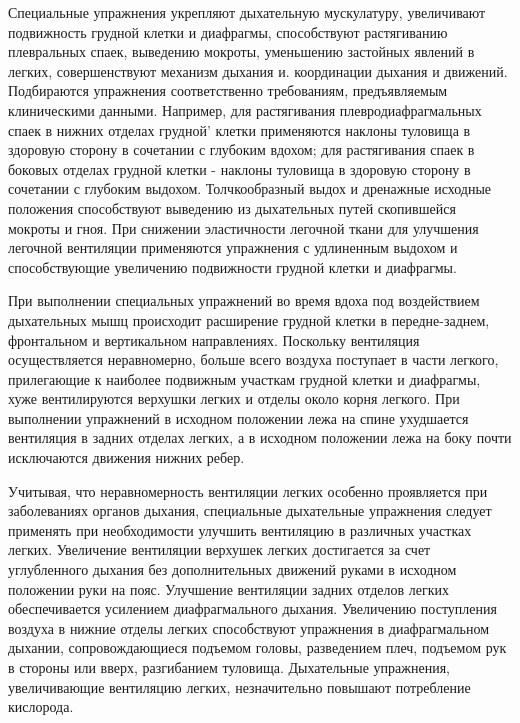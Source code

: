 \documentclass[a4paper,14pt]{extreport}
\begin{document}
Специальные упражнения  укрепляют дыхательную мускулатуру, увеличивают подвижность грудной клетки и диафрагмы, способствуют растягиванию плевральных спаек, выведению мокроты, уменьшению застойных явлений в легких, совершенствуют механизм дыхания и. координации дыхания и движений. Подбираются упражнения соответственно требованиям, предъявляемым клиническими данными. Например, для растягивания плевродиафрагмальных спаек в нижних отделах грудной' клетки применяются наклоны туловища в здоровую сторону в сочетании с глубоким вдохом; для растягивания спаек в боковых отделах грудной клетки - наклоны туловища в здоровую сторону в сочетании с глубоким выдохом. Толчкообразный выдох и дренажные исходные положения способствуют выведению из дыхательных путей скопившейся мокроты и гноя. При снижении эластичности легочной ткани для улучшения легочной вентиляции применяются упражнения с удлиненным выдохом и способствующие увеличению подвижности грудной клетки и диафрагмы.

При выполнении специальных упражнений во время вдоха под воздействием дыхательных мышц происходит расширение грудной клетки в передне-заднем, фронтальном и вертикальном направлениях. Поскольку вентиляция осуществляется неравномерно, больше всего воздуха поступает в части легкого, прилегающие к наиболее подвижным участкам грудной клетки и диафрагмы, хуже вентилируются верхушки легких и отделы около корня легкого. При выполнении упражнений в исходном положении лежа на спине ухудшается вентиляция в задних отделах легких, а в исходном положении лежа на боку почти исключаются движения нижних ребер.

Учитывая, что неравномерность вентиляции легких особенно проявляется при заболеваниях органов дыхания, специальные дыхательные упражнения следует применять при необходимости улучшить вентиляцию в различных участках легких. Увеличение вентиляции верхушек легких достигается за счет углубленного дыхания без дополнительных движений руками в исходном положении руки на пояс. Улучшение вентиляции задних отделов легких обеспечивается усилением диафрагмального дыхания. Увеличению поступления воздуха в нижние отделы легких способствуют упражнения в диафрагмальном дыхании, сопровождающиеся подъемом головы, разведением плеч, подъемом рук в стороны или вверх, разгибанием туловища. Дыхательные упражнения, увеличивающие вентиляцию легких, незначительно повышают потребление кислорода.
\end{document}
